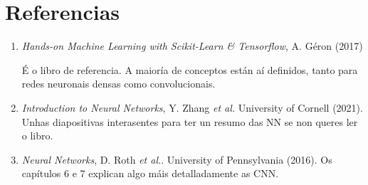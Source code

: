 \documentclass[11pt, a4paper]{article}
\begin{document}
\section{Referencias}
\begin{enumerate}
    \item \textit{Hands-on Machine Learning with Scikit-Learn \& Tensorflow}, A. Géron (2017)
    
    É o libro de referencia. A maioría de conceptos están aí definidos, tanto para redes neuronais densas como convolucionais.

    \item \textit{Introduction to Neural Networks}, Y. Zhang \textit{et al.} University of Cornell (2021). Unhas diapositivas interasentes para ter un resumo das NN se non queres ler o libro.
    \item \textit{Neural Networks}, D. Roth \textit{et al.}. University of Pennsylvania (2016). Os capítulos 6 e 7 explican algo máis detalladamente as CNN.
\end{enumerate}
\end{document}
